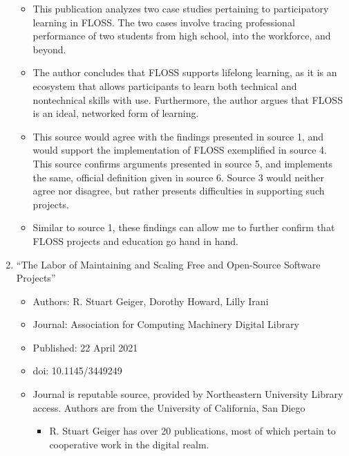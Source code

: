 \begin{enumerate}
\begin{itemize}
      \item This publication analyzes two case studies pertaining to participatory learning in FLOSS. The two cases involve tracing professional performance of two students from high school, into the workforce, and beyond.

      \item The author concludes that FLOSS supports lifelong learning, as it is an ecosystem that allows participants to learn both technical and nontechnical skills with use. Furthermore, the author argues that FLOSS is an ideal, networked form of learning.

      \item This source would agree with the findings presented in source 1, and would support the implementation of FLOSS exemplified in source 4. This source confirms arguments presented in source 5, and implements the same, official definition given in source 6. Source 3 would neither agree nor disagree, but rather presents difficulties in supporting such projects.

      \item Similar to source 1, these findings can allow me to further confirm that FLOSS projects and education go hand in hand.

    \end{itemize}

  \item ``The Labor of Maintaining and Scaling Free and Open-Source Software Projects''

    \begin{itemize}

      \item Authors: R. Stuart Geiger, Dorothy Howard, Lilly Irani

      \item Journal: Association for Computing Machinery Digital Library

      \item Published: 22 April 2021

      \item doi: 10.1145/3449249

      \item Journal is reputable source, provided by Northeastern University Library access. Authors are from the University of California, San Diego

        \begin{itemize}

          \item R. Stuart Geiger has over 20 publications, most of which pertain to cooperative work in the digital realm.


\end{itemize}
\end{itemize}
\end{enumerate}
